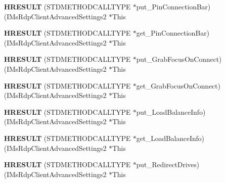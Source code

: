 \begin{DoxyCompactItemize}
{\bfseries H\+R\+E\+S\+U\+LT} (S\+T\+D\+M\+E\+T\+H\+O\+D\+C\+A\+L\+L\+T\+Y\+PE $\ast$put\+\_\+\+Pin\+Connection\+Bar)(I\+Ms\+Rdp\+Client\+Advanced\+Settings2 $\ast$This
\item 
\mbox{\label{struct_i_ms_rdp_client_advanced_settings2_vtbl_ad4f25ea9bf108e4c06acb5022e891fb0}} 
{\bfseries H\+R\+E\+S\+U\+LT} (S\+T\+D\+M\+E\+T\+H\+O\+D\+C\+A\+L\+L\+T\+Y\+PE $\ast$get\+\_\+\+Pin\+Connection\+Bar)(I\+Ms\+Rdp\+Client\+Advanced\+Settings2 $\ast$This
\item 
\mbox{\label{struct_i_ms_rdp_client_advanced_settings2_vtbl_aef44330913aeaa487c2fe85146e5cdf3}} 
{\bfseries H\+R\+E\+S\+U\+LT} (S\+T\+D\+M\+E\+T\+H\+O\+D\+C\+A\+L\+L\+T\+Y\+PE $\ast$put\+\_\+\+Grab\+Focus\+On\+Connect)(I\+Ms\+Rdp\+Client\+Advanced\+Settings2 $\ast$This
\item 
\mbox{\label{struct_i_ms_rdp_client_advanced_settings2_vtbl_a691e3f4879fa7ddb300e7033fb3df2b7}} 
{\bfseries H\+R\+E\+S\+U\+LT} (S\+T\+D\+M\+E\+T\+H\+O\+D\+C\+A\+L\+L\+T\+Y\+PE $\ast$get\+\_\+\+Grab\+Focus\+On\+Connect)(I\+Ms\+Rdp\+Client\+Advanced\+Settings2 $\ast$This
\item 
\mbox{\label{struct_i_ms_rdp_client_advanced_settings2_vtbl_a34c58ef6e8d8c506f66789017cc3a981}} 
{\bfseries H\+R\+E\+S\+U\+LT} (S\+T\+D\+M\+E\+T\+H\+O\+D\+C\+A\+L\+L\+T\+Y\+PE $\ast$put\+\_\+\+Load\+Balance\+Info)(I\+Ms\+Rdp\+Client\+Advanced\+Settings2 $\ast$This
\item 
\mbox{\label{struct_i_ms_rdp_client_advanced_settings2_vtbl_a89f97f7fdb99e206e89f53cea28aaee1}} 
{\bfseries H\+R\+E\+S\+U\+LT} (S\+T\+D\+M\+E\+T\+H\+O\+D\+C\+A\+L\+L\+T\+Y\+PE $\ast$get\+\_\+\+Load\+Balance\+Info)(I\+Ms\+Rdp\+Client\+Advanced\+Settings2 $\ast$This
\item 
\mbox{\label{struct_i_ms_rdp_client_advanced_settings2_vtbl_a6a695dc7141d51eb29544938e37b0e44}} 
{\bfseries H\+R\+E\+S\+U\+LT} (S\+T\+D\+M\+E\+T\+H\+O\+D\+C\+A\+L\+L\+T\+Y\+PE $\ast$put\+\_\+\+Redirect\+Drives)(I\+Ms\+Rdp\+Client\+Advanced\+Settings2 $\ast$This

\end{DoxyCompactItemize}
